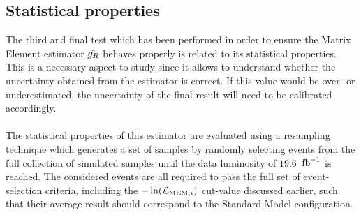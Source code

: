 \subsection{Statistical properties} \label{subsec::StatProp}

The third and final test which has been performed in order to ensure the Matrix Element estimator $\hat{g_{R}}$ behaves properly is related to its statistical properties.
This is a necessary aspect to study since it allows to understand whether the uncertainty obtained from the estimator is correct. If this value would be over- or underestimated, the uncertainty of the final result will need to be calibrated accordingly.
\\
\\
The statistical properties of this estimator are evaluated using a resampling technique which generates a set of samples by randomly selecting events from the full collection of simulated samples until the data luminosity of $19.6$ $\, \mathrm{fb}^{-1}$ is reached.
The considered events are all required to pass the full set of event-selection criteria, including the $-\ln(\mathcal{L}_{\textrm{MEM}, i})$ cut-value discussed earlier, such that their average result should correspond to the Standard Model configuration.
\\

